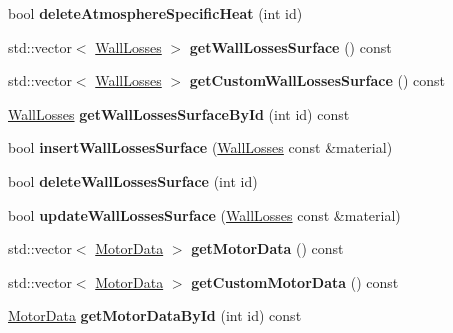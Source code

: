 \begin{DoxyCompactItemize}
\mbox{\label{class_s_q_lite_a32f61e2c425864cf222ee427abd33448}} 
bool {\bfseries delete\+Atmosphere\+Specific\+Heat} (int id)
\item 
\mbox{\label{class_s_q_lite_ac385b0462588b7a18349d1621ceac57c}} 
std\+::vector$<$ \hyperlink{class_wall_losses}{Wall\+Losses} $>$ {\bfseries get\+Wall\+Losses\+Surface} () const
\item 
\mbox{\label{class_s_q_lite_aaf414f89916731a94d8c81a98d36987d}} 
std\+::vector$<$ \hyperlink{class_wall_losses}{Wall\+Losses} $>$ {\bfseries get\+Custom\+Wall\+Losses\+Surface} () const
\item 
\mbox{\label{class_s_q_lite_a3a7f473d8e23630dae65cd3c3dd7fa97}} 
\hyperlink{class_wall_losses}{Wall\+Losses} {\bfseries get\+Wall\+Losses\+Surface\+By\+Id} (int id) const
\item 
\mbox{\label{class_s_q_lite_a97d510f6f16aa70c61a9dc6a629ad786}} 
bool {\bfseries insert\+Wall\+Losses\+Surface} (\hyperlink{class_wall_losses}{Wall\+Losses} const \&material)
\item 
\mbox{\label{class_s_q_lite_ab9492a672cb89dfeae330b99ea03ceeb}} 
bool {\bfseries delete\+Wall\+Losses\+Surface} (int id)
\item 
\mbox{\label{class_s_q_lite_ac4b7397ef51a0544d38f670ef995f26e}} 
bool {\bfseries update\+Wall\+Losses\+Surface} (\hyperlink{class_wall_losses}{Wall\+Losses} const \&material)
\item 
\mbox{\label{class_s_q_lite_a654ac1320d5629702346f55f99a648c9}} 
std\+::vector$<$ \hyperlink{class_motor_data}{Motor\+Data} $>$ {\bfseries get\+Motor\+Data} () const
\item 
\mbox{\label{class_s_q_lite_a40f0107a78cdb8d735242d954da87ac7}} 
std\+::vector$<$ \hyperlink{class_motor_data}{Motor\+Data} $>$ {\bfseries get\+Custom\+Motor\+Data} () const
\item 
\mbox{\label{class_s_q_lite_a4b0a99992e2909216b40dc499c86a028}} 
\hyperlink{class_motor_data}{Motor\+Data} {\bfseries get\+Motor\+Data\+By\+Id} (int id) const

\end{DoxyCompactItemize}
